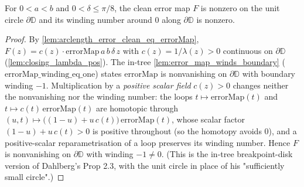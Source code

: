 \begin{lemma}

  \label{lem:clean_error_winds}
  For $0<a<b$ and $0<\delta\le\pi/8$, the clean error map $F$ is nonzero on the unit
  circle $\partial\mathbb{D}$ and its winding number around $0$ along
  $\partial\mathbb{D}$ is nonzero.
\end{lemma}
\begin{proof}
  \leanok
  By \cref{lem:arclength_error_clean_eq_errorMap}, $F(z)=c(z)\cdot\mathrm{errorMap}\,a\,b\,\delta\,z$
  with $c(z)=1/\lambda(z)>0$ continuous on $\partial\mathbb{D}$
  (\cref{lem:closing_lambda_pos}). The in-tree \cref{lem:error_map_winds_boundary}
  ($\mathrm{errorMap\_winding\_eq\_one}$) states $\mathrm{errorMap}$ is nonvanishing
  on $\partial\mathbb{D}$ with boundary winding $-1$. Multiplication by a
  \emph{positive scalar field} $c(z)>0$ changes neither the nonvanishing nor the
  winding number: the loops $t\mapsto\mathrm{errorMap}(t)$ and
  $t\mapsto c(t)\,\mathrm{errorMap}(t)$ are homotopic through
  $(u,t)\mapsto\bigl((1-u)+u\,c(t)\bigr)\,\mathrm{errorMap}(t)$, whose scalar factor
  $(1-u)+u\,c(t)>0$ is positive throughout (so the homotopy avoids $0$), and a
  positive-scalar reparametrisation of a loop preserves its winding number. Hence $F$
  is nonvanishing on $\partial\mathbb{D}$ with winding $-1\neq0$. (This is the
  in-tree breakpoint-disk version of Dahlberg's Prop 2.3, with the unit circle in
  place of his "sufficiently small circle".)
\end{proof}

